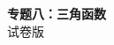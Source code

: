 \documentclass[zihao=-4]{exam-zh}
\begin{document}
\begin{center}
  {\bfseries 专题八：三角函数}\\[4pt]
  { 试卷版}
\end{center}

\end{document}
